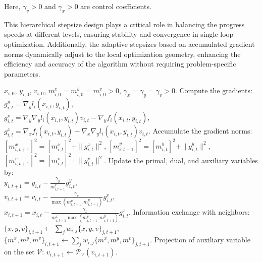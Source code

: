 \documentclass{article}
\theoremstyle{plain}
\theoremstyle{definition}
\theoremstyle{remark}
\begin{document}
\vspace{-0.1cm}

Here, \(\gamma_v > 0\) and \(\gamma_x > 0\) are control coefficients.  

This hierarchical stepsize design plays a critical role in balancing the progress speeds at different levels, ensuring stability and convergence in single-loop optimization. Additionally, the adaptive stepsizes based on accumulated gradient norms dynamically adjust to the local optimization geometry, enhancing the efficiency and accuracy of the algorithm without requiring problem-specific parameters.

\begin{algorithm}[tb]
   \caption{Adaptive Single-Loop Decentralized Bilevel Optimization: Procedures at Each Agent $i\in[n]$}
   \label{alg1}
\begin{algorithmic}[1]
     $x_{i,0}$, $y_{i,0}$, $v_{i,0}$, $m^x_{i,0} = m^y_{i,0} = m^v_{i,0} > 0$, $\gamma_x=\gamma_y=\gamma_v > 0$.
        \STATE Compute the gradients: \\
        $g^y_{i,t} = \nabla_y l_i(x_{i,t}, y_{i,t})$,\\
        $g^v_{i,t} = \nabla_y\nabla_y l_i(x_{i,t}, y_{i,t}) v_{i,t}-\nabla_y f_i(x_{i,t}, y_{i,t})$,\\
        $g^x_{i,t} = \nabla_x f_i(x_{i,t}, y_{i,t}) - \nabla_x\nabla_y l_i(x_{i,t}, y_{i,t}) v_{i,t}$.
        \STATE Accumulate the gradient norms:\\
        $[m^x_{i,t+1}]^2 = [m^x_{i,t}]^2 + \|g^x_{i,t}\|^2$,
        $[m^y_{i,t+1}]^2 = [m^y_{i,t}]^2 + \|g^y_{i,t}\|^2$,
        $[m^v_{i,t+1}]^2 = [m^v_{i,t}]^2 + \|g^v_{i,t}\|^2$.
        \STATE Update the primal, dual, and auxiliary variables by: \\
        $y_{i,t+1} = y_{i,t} - \frac{\gamma_y}{m^y_{i,t+1}} g^y_{i,t}$,\\
        $v_{i,t+1} = v_{i,t} - \frac{\gamma_v }{\max(m^v_{i,t+1}, m^y_{i,t+1})} g^v_{i,t}$,\\
        $x_{i,t+1} = x_{i,t} - \frac{\gamma_x }{m^x_{i,t+1}\max(m^v_{i,t+1}, m^y_{i,t+1})} g^x_{i,t}$.
        \STATE Information exchange with neighbors:\\
        $\{x, y, v\}_{i,t+1} \gets \sum_{j} w_{i,j} \{x, y, v\}_{j,t+1}$,\\
        $\{m^x, m^y, m^v\!\}_{i,t+1} \gets \sum_{j} w_{i,j} \{m^x, m^y, m^v\!\}_{j,t+1}$.
        \STATE Projection of auxiliary variable on the set $\mathcal{V}$: $v_{i,t+1} \leftarrow \mathcal{P}_{\mathcal{V}}(v_{i,t+1})$.
   \ENDFOR
\end{algorithmic}
\end{algorithm}
\end{document}
